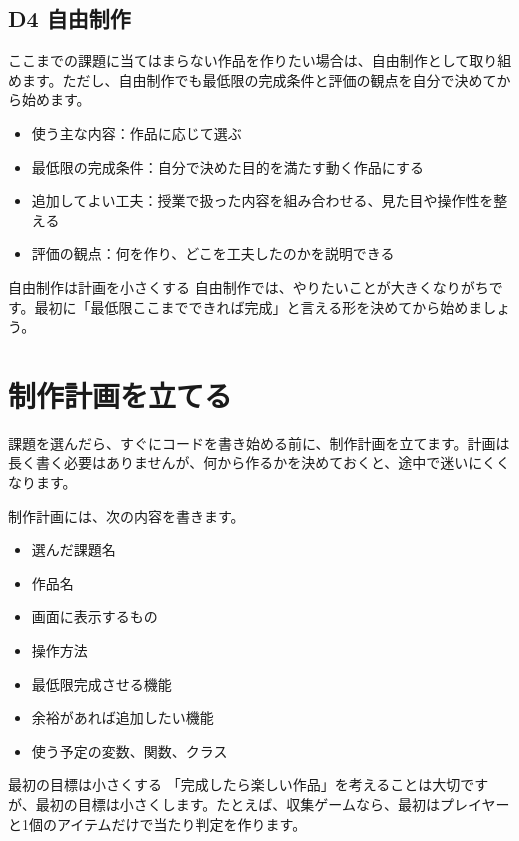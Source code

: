 \subsection{D4 自由制作}

ここまでの課題に当てはまらない作品を作りたい場合は、自由制作として取り組めます。ただし、自由制作でも最低限の完成条件と評価の観点を自分で決めてから始めます。

\begin{itemize}
    \item 使う主な内容：作品に応じて選ぶ
    \item 最低限の完成条件：自分で決めた目的を満たす動く作品にする
    \item 追加してよい工夫：授業で扱った内容を組み合わせる、見た目や操作性を整える
    \item 評価の観点：何を作り、どこを工夫したのかを説明できる
\end{itemize}

\begin{notebox}{自由制作は計画を小さくする}
自由制作では、やりたいことが大きくなりがちです。最初に「最低限ここまでできれば完成」と言える形を決めてから始めましょう。
\end{notebox}

\section{制作計画を立てる}

課題を選んだら、すぐにコードを書き始める前に、制作計画を立てます。計画は長く書く必要はありませんが、何から作るかを決めておくと、途中で迷いにくくなります。

制作計画には、次の内容を書きます。

\begin{itemize}
    \item 選んだ課題名
    \item 作品名
    \item 画面に表示するもの
    \item 操作方法
    \item 最低限完成させる機能
    \item 余裕があれば追加したい機能
    \item 使う予定の変数、関数、クラス
\end{itemize}

\begin{pointbox}{最初の目標は小さくする}
「完成したら楽しい作品」を考えることは大切ですが、最初の目標は小さくします。たとえば、収集ゲームなら、最初はプレイヤーと1個のアイテムだけで当たり判定を作ります。
\end{pointbox}

